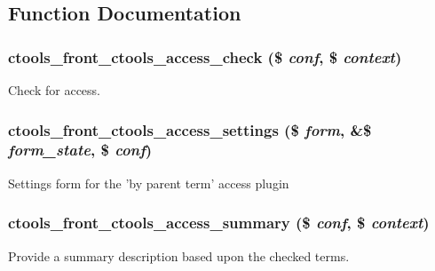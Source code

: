 \subsection{Function Documentation}
\hypertarget{front_8inc_ab2a1e57e6f2d8bf27845aeea6428af76}{
\subsubsection[{ctools\_\-front\_\-ctools\_\-access\_\-check}]{\setlength{\rightskip}{0pt plus 5cm}ctools\_\-front\_\-ctools\_\-access\_\-check (\$ {\em conf}, \/  \$ {\em context})}}
\label{front_8inc_ab2a1e57e6f2d8bf27845aeea6428af76}
Check for access. \hypertarget{front_8inc_a19eabac2ae4f01d216eb0a2e44885e0f}{
\subsubsection[{ctools\_\-front\_\-ctools\_\-access\_\-settings}]{\setlength{\rightskip}{0pt plus 5cm}ctools\_\-front\_\-ctools\_\-access\_\-settings (\$ {\em form}, \/  \&\$ {\em form\_\-state}, \/  \$ {\em conf})}}
\label{front_8inc_a19eabac2ae4f01d216eb0a2e44885e0f}
Settings form for the 'by parent term' access plugin \hypertarget{front_8inc_aaafad56207919a3c1e59bf615ab7540c}{
\subsubsection[{ctools\_\-front\_\-ctools\_\-access\_\-summary}]{\setlength{\rightskip}{0pt plus 5cm}ctools\_\-front\_\-ctools\_\-access\_\-summary (\$ {\em conf}, \/  \$ {\em context})}}
\label{front_8inc_aaafad56207919a3c1e59bf615ab7540c}
Provide a summary description based upon the checked terms. 

